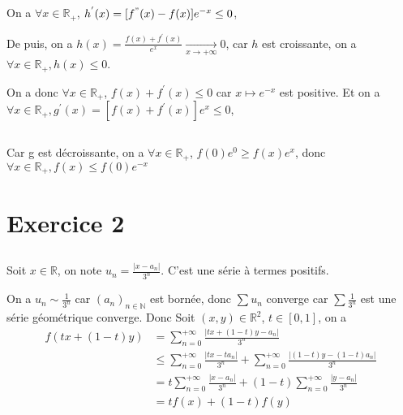 \documentclass[a4paper,12pt]{book}
\begin{document}
\subsection{}
On a $\forall x\in \mathbb{R}_+$, $h^{'}(x)=[f^{"}(x)-f(x)]e^{-x}\leq 0$, 

De puis, on a $h(x)=\frac{f(x)+f^{'}(x)}{e^x}\xrightarrow[x \to +\infty]{}0$, car $h$ est croissante, on a $\boxed{\forall x \in \mathbb{R}_+, h(x) \leq 0}$. 

On a donc $\forall x \in \mathbb{R}_+$, $f(x)+f^{'}(x) \leq 0$ car $x \mapsto e^{-x}$ est positive. Et on a $\forall x \in \mathbb{R}_+, g^{'}(x)=[f(x)+f^{'}(x)]e^x\leq 0$, 
\subsection{}
Car g est décroissante, on a $\forall x \in \mathbb{R}_+$, $f(0)e^0 \geq f(x)e^x$, 
donc  $\boxed{\forall x \in \mathbb{R}_+, f(x) \leq f(0)e^{-x}}$


\section{Exercice 2}
\subsection{}
Soit $x \in \mathbb{R}$, on note $u_n=\frac{|x-a_n|}{3^n}$. C'est une série à termes positifs. 

On a $u_n \sim \frac{1}{3^n}$ car $(a_n)_{n \in \mathbb{N}}$ est bornée, donc $\sum u_n$ converge car $\sum \frac{1}{3^n}$ est une série géométrique 
converge. Donc  
Soit $(x,y) \in \mathbb{R}^2$, $t \in [0,1]$, on a 
\begin{align*}
    f(tx+(1-t)y)&=\sum_{n=0}^{+\infty}\frac{|tx+(1-t)y-a_n|}{3^n}\\
    &\leq\sum_{n=0}^{+\infty}\frac{|tx-ta_n|}{3^n}+\sum_{n=0}^{+\infty}\frac{|(1-t)y-(1-t)a_n|}{3^n}\\
    &=t\sum_{n=0}^{+\infty}\frac{|x-a_n|}{3^n}+(1-t)\sum_{n=0}^{+\infty}\frac{|y-a_n|}{3^n}\\
    &=tf(x)+(1-t)f(y)
\end{align*}
\end{document}
